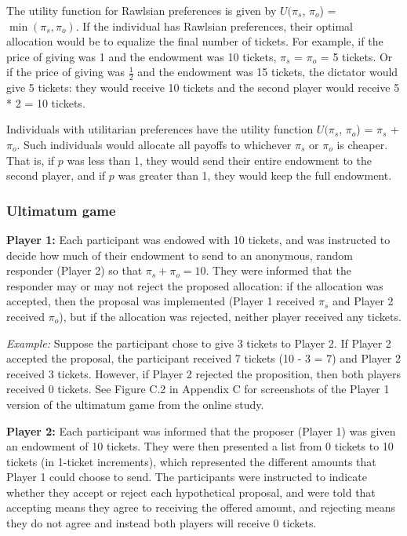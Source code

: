 \documentclass[12pt]{article}
\begin{document}
The utility function for Rawlsian preferences is given by \(U(\pi_{s}\), \(\pi_{o}\)) = \(\min(\pi_{s}, \pi_{o})\). If the individual has Rawlsian preferences, their optimal allocation would be to equalize the final number of tickets. For example, if the price of giving was 1 and the endowment was 10 tickets, \(\pi_{s}\) = \(\pi_{o}\) = 5 tickets. Or if the price of giving was \(\frac{1}{2}\) and the endowment was 15 tickets, the dictator would give 5 tickets: they would receive 10 tickets and the second player would receive 5 * 2 = 10 tickets. 

Individuals with utilitarian preferences have the utility function \(U(\pi_{s}\), \(\pi_{o}\)) = \(\pi_{s}\) + \(\pi_{o}\). Such individuals would allocate all payoffs to whichever \(\pi_{s}\) or \(\pi_{o}\) is cheaper. That is, if \(p\) was less than 1, they would send their entire endowment to the second player, and if \(p\) was greater than 1, they would keep the full endowment.


\subsubsection{Ultimatum game}

\textbf{Player 1:} Each participant was endowed with 10 tickets, and was instructed to decide how much of their endowment to send to an anonymous, random responder (Player 2) so that \(\pi_{s} + \pi_{o} = 10\). They were informed that the responder may or may not reject the proposed allocation: if the allocation was accepted, then the proposal was implemented (Player 1 received \(\pi_{s}\) and Player 2 received \(\pi_{o}\)), but if the allocation was rejected, neither player received any tickets.

\textit{Example:} Suppose the participant chose to give 3 tickets to Player 2. If Player 2 accepted the proposal, the participant received 7 tickets (10 - 3 = 7) and Player 2 received 3 tickets. However, if Player 2 rejected the proposition, then both players received 0 tickets. See Figure C.2 in Appendix C for screenshots of the Player 1 version of the ultimatum game from the online study.
 
\textbf{Player 2:} Each participant was informed that the proposer (Player 1) was given an endowment of 10 tickets. They were then presented a list from 0 tickets to 10 tickets (in 1-ticket increments), which represented the different amounts that Player 1 could choose to send. The participants were instructed to indicate whether they accept or reject each hypothetical proposal, and were told that accepting means they agree to receiving the offered amount, and rejecting means they do not agree and instead both players will receive 0 tickets.
\end{document}
